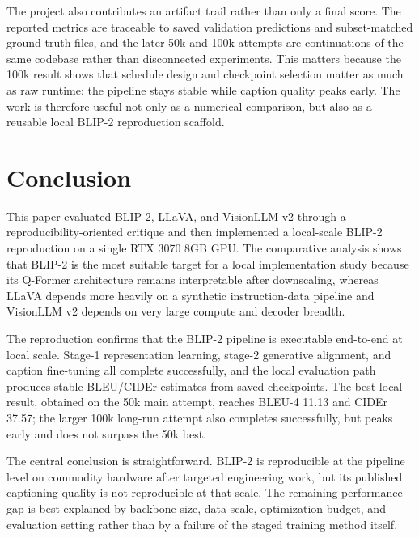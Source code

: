 \documentclass[11pt]{article}
\begin{document}
The project also contributes an artifact trail rather than only a final score. The
reported metrics are traceable to saved validation predictions and subset-matched
ground-truth files, and the later 50k and 100k attempts are continuations of the same
codebase rather than disconnected experiments. This matters because the 100k result
shows that schedule design and checkpoint selection matter as much as raw runtime: the
pipeline stays stable while caption quality peaks early. The work is therefore useful
not only as a numerical comparison, but also as a reusable local BLIP-2 reproduction
scaffold.

\section{Conclusion}
This paper evaluated BLIP-2, LLaVA, and VisionLLM v2 through a reproducibility-oriented
critique and then implemented a local-scale BLIP-2 reproduction on a single RTX 3070
8GB GPU. The comparative analysis shows that BLIP-2 is the most suitable target for a
local implementation study because its Q-Former architecture remains interpretable after
downscaling, whereas LLaVA depends more heavily on a synthetic instruction-data
pipeline and VisionLLM v2 depends on very large compute and decoder breadth.

The reproduction confirms that the BLIP-2 pipeline is executable end-to-end at local
scale. Stage-1 representation learning, stage-2 generative alignment, and caption
fine-tuning all complete successfully, and the local evaluation path produces stable
BLEU/CIDEr estimates from saved checkpoints. The best local result, obtained on the
50k main attempt, reaches BLEU-4 11.13 and CIDEr 37.57; the larger 100k long-run
attempt also completes successfully, but peaks early and does not surpass the 50k best.

The central conclusion is straightforward. BLIP-2 is reproducible at the pipeline
level on commodity hardware after targeted engineering work, but its published
captioning quality is not reproducible at that scale. The remaining performance gap is
best explained by backbone size, data scale, optimization budget, and evaluation
setting rather than by a failure of the staged training method itself.


\end{document}
